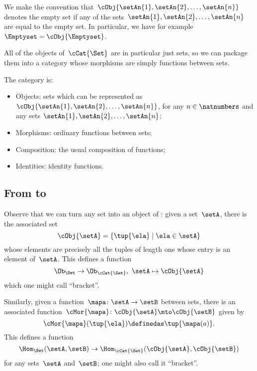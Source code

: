 We make the convention that~$\cObj{\setAn{1}, \setAn{2}, \ldots, \setAn{n}}$ denotes the empty set if any of the sets~$\setAn{1}, \setAn{2}, \ldots , \setAn{n}$ are equal to the empty set. In particular, we have for example  $\Emptyset = \cObj{\Emptyset}$. 


All of the objects of~$\cCat{\Set}$ are in particular just sets, so we can package them into a category whose morphisms are simply functions between sets.

\begin{ctdefinition}[\cCat{\Set}]
    The category \cCat{\Set} is:
    \begin{itemize}
        \item Objects: sets which can be represented as~$\cObj{\setAn{1}, \setAn{2}, \ldots, \setAn{n}}$, for any $n \in \natnumbers$ and any sets $\setAn{1}, \setAn{2}, \ldots, \setAn{n}$;
        \item Morphisms: ordinary functions between sets;
        \item Composition: the usual composition of functions;
        \item Identities: identity functions.
    \end{itemize}
\end{ctdefinition}

\subsection{From \Set to \cCat{\Set}}

Observe that we can turn any set into an object of \cCat{\Set}: given a set~$\setA$, there is the associated set
\begin{equation*}
    \cObj{\setA} = \{ \tup{\ela} \mid \ela \in \setA \}
\end{equation*}
whose elements are precisely all the tuples of length one whose entry is an element of~$\setA$.
This defines a function
\begin{equation*}
    \Ob_{\Set} \to \Ob_{\cCat{\Set}}, \ \setA \mapsto \cObj{\setA}
\end{equation*}
which one might call ``bracket''.

Similarly, given a function~$\mapa \colon \setA \to \setB$ between sets, there is an associated function~$\cMor{ \mapa }\colon \cObj{\setA} \mto \cObj{\setB}$ given by
\begin{equation*}
    \cMor{ \mapa } ( \tup{ \ela }) \definedas \tup{\mapa(a)}.
\end{equation*}
This defines a function
\begin{equation*}
    \Hom_{\Set}(\setA,\setB) \to \Hom_{\cCat{\Set}}(\cObj{\setA},\cObj{\setB})
\end{equation*}
for any sets~$\setA$ and~$\setB$; one might also call it ``bracket''.

